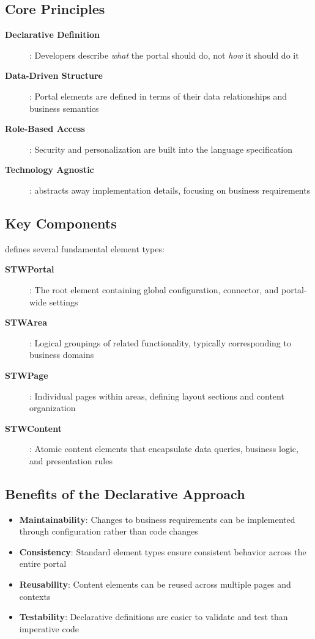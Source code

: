 \subsection{Core Principles}

\begin{description}
\item[\textbf{Declarative Definition}]: Developers describe \textit{what} the portal should do, not \textit{how} it should do it
\item[\textbf{Data-Driven Structure}]: Portal elements are defined in terms of their data relationships and business semantics
\item[\textbf{Role-Based Access}]: Security and personalization are built into the language specification
\item[\textbf{Technology Agnostic}]: \wbol{} abstracts away implementation details, focusing on business requirements
\end{description}

\subsection{Key Components}

\wbol{} defines several fundamental element types:

\begin{description}
\item[\textbf{STWPortal}]: The root element containing global configuration, connector, and portal-wide settings
\item[\textbf{STWArea}]: Logical groupings of related functionality, typically corresponding to business domains
\item[\textbf{STWPage}]: Individual pages within areas, defining layout sections and content organization
\item[\textbf{STWContent}]: Atomic content elements that encapsulate data queries, business logic, and presentation rules
\end{description}

\subsection{Benefits of the Declarative Approach}

\begin{itemize}
	\item \textbf{Maintainability}: Changes to business requirements can be implemented through configuration rather than code changes
	\item \textbf{Consistency}: Standard element types ensure consistent behavior across the entire portal
	\item \textbf{Reusability}: Content elements can be reused across multiple pages and contexts
	\item \textbf{Testability}: Declarative definitions are easier to validate and test than imperative code
\end{itemize}

